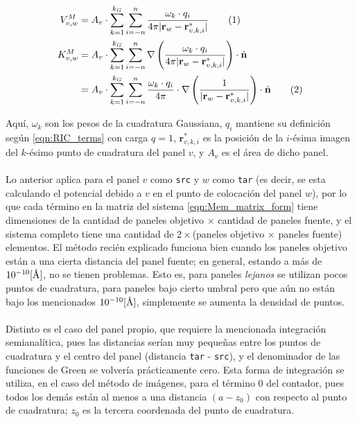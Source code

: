 \documentclass[12pt, twoside, onehalfspace, numbers, spanish]{ezthesis}
\newcommand\numberthis{\addtocounter{equation}{1}\tag{\theequation}}
\numberwithin{equation}{section}
\newcommand{\angstrom}{\text{\normalfont\AA}}
\begin{document}
\begin{align*}
V_{v,w}^M &= A_v\cdot\sum_{k=1}^{k_G}\sum_{i=-n}^{n}\frac{\omega_k\cdot q_i}{4\pi|\mathbf{r}_w - \mathbf{r}_{v,k,i}^*|} \numberthis\\
K_{v,w}^M &= A_v\cdot\sum_{k=1}^{k_G}\sum_{i=-n}^{n}\nabla\left(\frac{\omega_k\cdot q_i}{4\pi|\mathbf{r}_w - \mathbf{r}_{v,k,i}^*|}\right)\cdot\hat{\mathbf{n}} \\
&= A_v\cdot\sum_{k=1}^{k_G}\sum_{i=-n}^{n}\frac{\omega_k\cdot q_i}{4\pi}\cdot\nabla\left(\frac{1}{|\mathbf{r}_w - \mathbf{r}_{v,k,i}^*|}\right)\cdot\hat{\mathbf{n}}\numberthis
\end{align*}


\noindent
Aquí, $\omega_k$ son los pesos de la cuadratura Gaussiana, $q_i$ mantiene su definición según \ref{eqn:RIC_terms} con carga $q = 1$, $\mathbf{r}_{v,k,i}^*$ es la posición de la $i$-ésima imagen del $k$-ésimo punto de cuadratura del panel $v$, y $A_v$ es el área de dicho panel.\\\\
Lo anterior aplica para el panel $v$ como \texttt{src} y $w$ como \texttt{tar} (es decir, se esta calculando el potencial debido a $v$ en el punto de colocación del panel $w$), por lo que cada término en la matriz del sistema \ref{eqn:Mem_matrix_form} tiene dimensiones de la cantidad de paneles objetivo $\times$ cantidad de paneles fuente, y el sistema completo tiene una cantidad de $2\times$(paneles objetivo $\times$ paneles fuente) elementos. El método recién explicado funciona bien cuando los paneles objetivo están a una cierta distancia del panel fuente; en general, estando a más de $10^{-10} [\angstrom]$, no se tienen problemas. Esto es, para paneles \textit{lejanos} se utilizan pocos puntos de cuadratura, para paneles bajo cierto umbral pero que aún no están bajo los mencionados $10^{-10} [\angstrom]$, simplemente se aumenta la densidad de puntos.\\\\
Distinto es el caso del panel propio, que requiere la mencionada integración semianalítica, pues las distancias serían muy pequeñas entre los puntos de cuadratura y el centro del panel (distancia \texttt{tar} - \texttt{src}), y el denominador de las funciones de Green se volvería prácticamente cero. Esta forma de integración se utiliza, en el caso del método de imágenes, para el término 0 del contador, pues todos los demás están al menos a una distancia $(a - z_0)$ con respecto al punto de cuadratura; $z_0$ es la tercera coordenada del punto de cuadratura.\\\\
\end{document}
